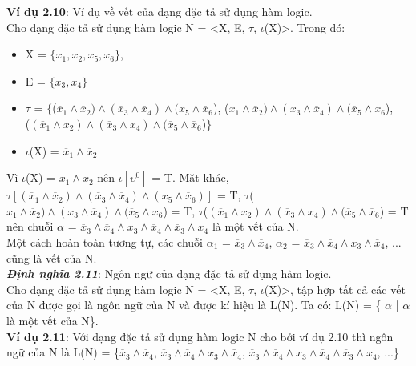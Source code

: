 \documentclass[a4paper,13pt,oneside,openany]{book}
\begin{document}
\begin{flushleft}
		\textbf{Ví dụ 2.10}: Ví dụ về vết của dạng đặc tả sử dụng hàm logic.\\
		Cho dạng đặc tả sử dụng hàm logic N = <X, E, $\tau$, $\iota$(X)>. Trong đó:\\
		\begin{itemize}
			\item X = $\{x_1, x_2, x_5, x_6\}$,
			\item E = $\{x_3, x_4\}$
			\item $\tau$ = $\{$($\overline{x}_1 \land \overline{x}_2) \land (\overline{x}_3 \land \overline{x}_4) \land (x_5 \land \overline{x}_6$), ($x_1\land\overline{x}_2)\land (x_3\land \overline{x}_4)\land (\overline{x}_5 \land x_6$),\\
			($(\overline{x}_1\land x_2)\land(\overline{x}_3\land x_4)\land (\overline{x}_5\land\overline{x}_6$)$\}$
			\item $\iota$(X) = $\overline{x}_1 \land \overline{x}_2$
		\end{itemize}
		Vì $\iota$(X) = $\overline{x}_1 \land \overline{x}_2$ nên $\iota[\upsilon^0]$ = T. Măt khác, $\tau[(\overline{x}_1 \land \overline{x}_2) \land (\overline{x}_3 \land \overline{x}_4) \land (x_5 \land \overline{x}_6)]$ = T, $\tau$($x_1\land\overline{x}_2)\land (x_3\land \overline{x}_4)\land (\overline{x}_5 \land x_6$) = T, $\tau$($(\overline{x}_1\land x_2)\land(\overline{x}_3\land x_4)\land (\overline{x}_5\land\overline{x}_6$) = T nên chuỗi $\alpha$ = $\overline{x}_3 \land \overline{x}_4 \land x_3 \land \overline{x}_4 \land \overline{x}_3 \land x_4$ là một vết của N.\\
		Một cách hoàn toàn tương tự, các chuỗi $\alpha_1$ = $\overline{x}_3 \land \overline{x}_4$, $\alpha_2$ = $\overline{x}_3 \land \overline{x}_4 \land x_3 \land \overline{x}_4$, ... cũng là vết của N.\\
		\textbf{\textit{Định nghĩa 2.11}}: Ngôn ngữ của dạng đặc tả sử dụng hàm logic.\\
		Cho dạng đặc tả sử dụng hàm logic N = <X, E, $\tau$, $\iota$(X)>, tập hợp tất cả các vết của N được gọi là ngôn ngữ của N và được kí hiệu là L(N). Ta có: L(N) =  \{ $\alpha$ | $\alpha$ là một vết của N\}.\\
		\textbf{Ví dụ 2.11}: Với dạng đặc tả sử dụng hàm logic N cho bởi ví dụ 2.10 thì ngôn ngữ của N là L(N) = \{$\overline{x}_3 \land \overline{x}_4$, $\overline{x}_3 \land \overline{x}_4 \land x_3 \land \overline{x}_4$, $\overline{x}_3 \land \overline{x}_4 \land x_3 \land \overline{x}_4 \land \overline{x}_3 \land x_4$, ...\}

\end{flushleft}
\end{document}
